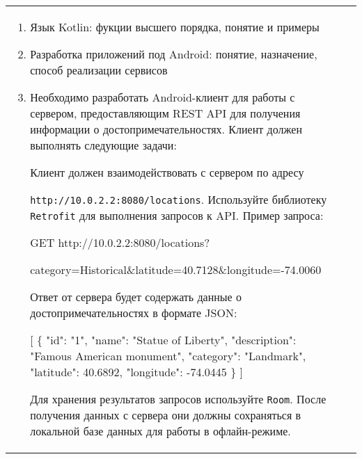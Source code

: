 \documentclass[a4paper]{article}
\begin{document}
\begin{tabular}{!{\vrule width 2pt}p{5cm}|p{6cm}|p{4cm}!{\vrule width 2pt}}
{\begin{minipage}{16cm}
\fontsize{14pt}{16pt}\selectfont\itshape
\begin{enumerate}
    \item Язык Kotlin: фукции высшего порядка, понятие и примеры
    \item Разработка приложений под Android: понятие, назначение, способ реализации сервисов
    \item %

Необходимо разработать Android-клиент для работы с сервером, предоставляющим REST API для получения информации о достопримечательностях. Клиент должен выполнять следующие задачи:


Клиент должен взаимодействовать с сервером по адресу 

\texttt{http://10.0.2.2:8080/locations}. Используйте библиотеку \texttt{Retrofit} для выполнения запросов к API. Пример запроса:

 GET http://10.0.2.2:8080/locations?

     category=Historical\&latitude=40.7128\&longitude=-74.0060 

Ответ от сервера будет содержать данные о достопримечательностях в формате JSON:

 [ \{ "id": "1", "name": "Statue of Liberty", 
     "description": "Famous American monument",
     "category": "Landmark", "latitude": 40.6892, 
     "longitude": -74.0445 \} ] 


Для хранения результатов запросов используйте \texttt{Room}. После получения данных с сервера они должны сохраняться в локальной базе данных для работы в офлайн-режиме.



\end{enumerate}
\end{minipage}}
\end{tabular}
\end{document}
